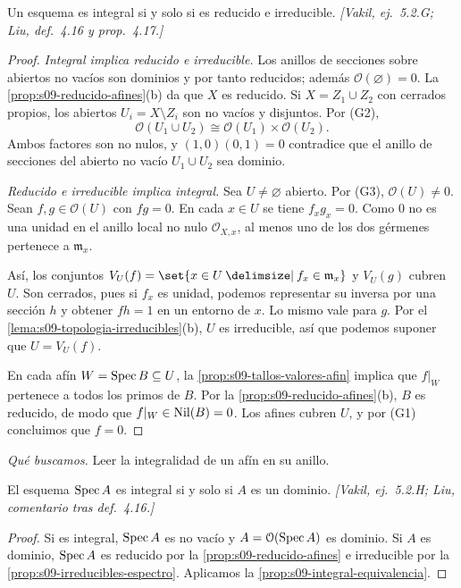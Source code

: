 \begin{prop}
\label{prop:s09-integral-equivalencia}
Un esquema es integral si y solo si es reducido e irreducible. \emph{[Vakil, ej.~5.2.G; Liu, def.~4.16 y prop.~4.17.]}
\end{prop}
\begin{proof}
\emph{Integral implica reducido e irreducible.} Los anillos de secciones sobre abiertos no vacíos son dominios y por tanto reducidos; además $\mathcal O(\varnothing)=0$. La \cref{prop:s09-reducido-afines}(b) da que $X$ es reducido. Si $X=Z_1\cup Z_2$ con cerrados propios, los abiertos $U_i=X\setminus Z_i$ son no vacíos y disjuntos. Por (G2),
\[
\mathcal O(U_1\cup U_2)\cong\mathcal O(U_1)\times\mathcal O(U_2).
\]
Ambos factores son no nulos, y $(1,0)(0,1)=0$ contradice que el anillo de secciones del abierto no vacío $U_1\cup U_2$ sea dominio.

\emph{Reducido e irreducible implica integral.} Sea $U\ne\varnothing$ abierto. Por (G3), $\mathcal O(U)\ne0$. Sean $f,g\in\mathcal O(U)$ con $fg=0$. En cada $x\in U$ se tiene $f_xg_x=0$. Como $0$ no es una unidad en el anillo local no nulo $\mathcal O_{X,x}$, al menos uno de los dos gérmenes pertenece a $\mathfrak m_x$.

Así, los conjuntos $V_U(f)=\set{x\in U\given f_x\in\mathfrak m_x}$ y $V_U(g)$ cubren $U$. Son cerrados, pues si $f_x$ es unidad, podemos representar su inversa por una sección $h$ y obtener $fh=1$ en un entorno de $x$. Lo mismo vale para $g$. Por el \cref{lema:s09-topologia-irreducibles}(b), $U$ es irreducible, así que podemos suponer que $U=V_U(f)$.

En cada afín $W=\operatorname{Spec} B\subseteq U$, la \cref{prop:s09-tallos-valores-afin} implica que $f|_W$ pertenece a todos los primos de $B$. Por la \cref{prop:s09-reducido-afines}(b), $B$ es reducido, de modo que $f|_W\in\operatorname{Nil}(B)=0$. Los afines cubren $U$, y por (G1) concluimos que $f=0$.
\end{proof}

\emph{Qué buscamos.} Leer la integralidad de un afín en su anillo.

\begin{coro}
\label{coro:s09-afin-integral}
El esquema $\operatorname{Spec} A$ es integral si y solo si $A$ es un dominio. \emph{[Vakil, ej.~5.2.H; Liu, comentario tras def.~4.16.]}
\end{coro}
\begin{proof}
Si es integral, $\operatorname{Spec} A$ es no vacío y $A=\mathcal O(\operatorname{Spec} A)$ es dominio. Si $A$ es dominio, $\operatorname{Spec} A$ es reducido por la \cref{prop:s09-reducido-afines} e irreducible por la \cref{prop:s09-irreducibles-espectro}. Aplicamos la \cref{prop:s09-integral-equivalencia}.
\end{proof}

